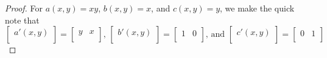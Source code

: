 \documentclass{article}
\theoremstyle{plain} %
\numberwithin{thm}{section} %
\theoremstyle{definition}
\begin{document}
\begin{proof}
            For \(a(x,y) = xy\), \(b(x,y) = x\), and \(c(x,y) = y\), we make the quick note that
            \[
                \begin{bmatrix}
                    a'(x,y) \\
                \end{bmatrix}
                =
                \begin{bmatrix}
                    y &  x \\
                \end{bmatrix}
                \text{, } 
                \begin{bmatrix}
                    b'(x,y) \\
                \end{bmatrix}
                =
                \begin{bmatrix}
                    1 &  0 \\
                \end{bmatrix}
                \text{, and } 
                \begin{bmatrix}
                    c'(x,y) \\
                \end{bmatrix}
                =
                \begin{bmatrix}
                    0 &  1 \\
                \end{bmatrix}
            \]


\end{proof}
\end{document}
